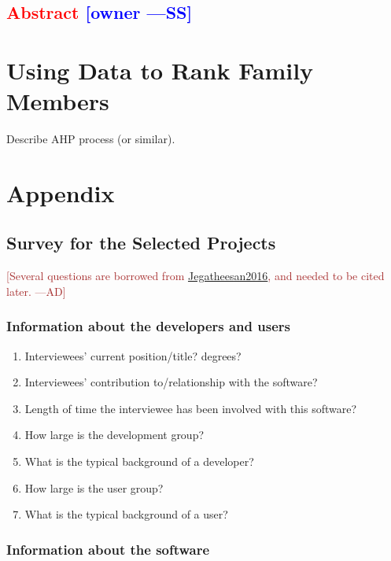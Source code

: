 \documentclass[letterpaper,cleveref]{lipics-v2019}
\newcommand{\authornote}[3]{\textcolor{#1}{[#3 ---#2]}}
\newcommand{\authornote}[3]{}
\newcommand{\wss}[1]{\authornote{blue}{SS}{#1}} %
\newcommand{\ad}[1]{\authornote{brown}{AD}{#1}} %
\newcommand{\notdone}[1]{\textcolor{red}{#1}}
\theoremstyle{definition}
\begin{document}
\subsection{\notdone{Abstract} \wss{owner}}

\section{Using Data to Rank Family Members}

Describe AHP process (or similar).

\appendix
\section{Appendix}
\subsection{Survey for the Selected Projects}
\ad{Several questions are borrowed from \href{https://gitlab.cas.mcmaster.ca/smiths/pub/-/blob/master/Jegatheesan2016.pdf}{Jegatheesan2016}, and needed to be cited later.}
\subsubsection{Information about the developers and users}
\begin{enumerate}
\item Interviewees' current position/title? degrees?
\item Interviewees' contribution to/relationship with the software?
\item Length of time the interviewee has been involved with this software?
\item How large is the development group?
\item What is the typical background of a developer?
\item How large is the user group?
\item What is the typical background of a user?
\end{enumerate}

\subsubsection{Information about the software}
\end{document}
